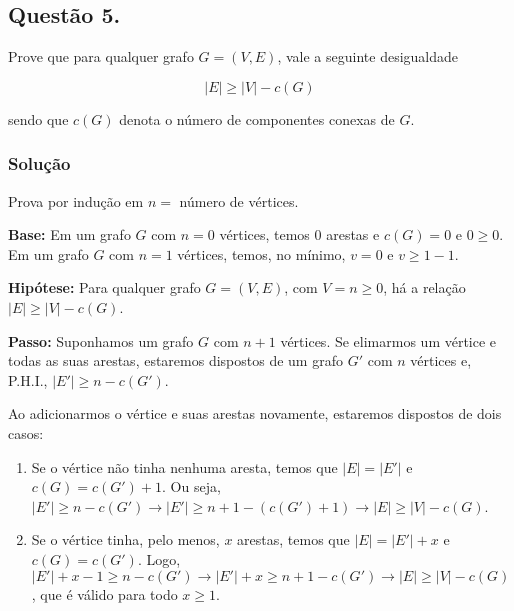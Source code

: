 \documentclass[12pt, letterpaper]{report}
\newcounter{ProblemNum}
\newcommand*{\anyproblem}[1]{\newpage\subsection*{#1}}
\newcommand*{\problem}[1]{\stepcounter{ProblemNum} %
   \anyproblem{Questão #1}}
\newcommand*{\soln}[1]{\subsubsection*{#1}}
\newcommand*{\solution}{\soln{Solução}}
\begin{document}
\problem{5.}
Prove que para qualquer grafo $G = (V, E)$, vale a seguinte desigualdade

$$ |E| \ge |V| - c(G)$$

sendo que $c(G)$ denota o número de componentes conexas de $G$.

\solution
  Prova por indução em $n = $ número de vértices.

  \textbf{Base:} Em um grafo $G$ com $n = 0$ vértices, temos $0$ arestas e $c(G) = 0$ e $0 \geq 0$.
  Em um grafo $G$ com $n = 1$ vértices, temos, no mínimo, $v = 0$ e $v \geq 1 - 1$.

  \textbf{Hipótese:} Para qualquer grafo $G = (V, E)$, com $V = n \geq 0$, há a relação $ |E| \ge |V| - c(G) $.

  \textbf{Passo:} Suponhamos um grafo $G$ com $n + 1$ vértices. Se elimarmos um vértice e todas as suas arestas, estaremos dispostos
  de um grafo $G'$ com $n$ vértices e, P.H.I., $|E'| \geq n - c(G')$.

  Ao adicionarmos o vértice e suas arestas novamente, estaremos dispostos de dois casos:
  \begin{enumerate}[label=\arabic*.]
    \item Se o vértice não tinha nenhuma aresta, temos que $|E| = |E'|$ e $c(G) = c(G') + 1$.
    Ou seja, $|E'| \geq n - c(G') \rightarrow |E'| \geq n + 1 - (c(G') + 1) \rightarrow |E| \geq |V| - c(G)$.

    \item Se o vértice tinha, pelo menos, $x$ arestas, temos que $|E| = |E'| + x$ e $c(G) = c(G')$.
    Logo, $|E'| + x - 1 \geq n - c(G') \rightarrow |E'| + x \geq n + 1 - c(G') \rightarrow |E| \geq |V| - c(G)$, que é válido para todo $x \geq 1$.
  \end{enumerate}
\end{document}
